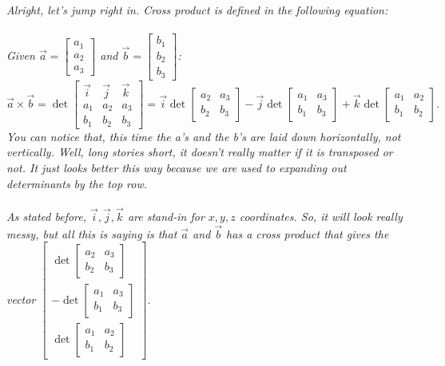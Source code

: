 \documentclass[addpoints]{exam}
\begin{document}
\textit{
Alright, let's jump right in. Cross product is defined in the following equation:\\\\ Given $\vec{a}=\begin{bmatrix}
    a_1\\a_2\\a_3
\end{bmatrix}$ and
$\vec{b}=\begin{bmatrix}
    b_1\\b_2\\b_3
\end{bmatrix}$: 
}
\[
\vec{a}\times\vec{b}=
\det\begin{bmatrix}
    \vec{i}&\vec{j}&\vec{k}\\
    a_1&a_2&a_3\\
    b_1&b_2&b_3
\end{bmatrix}
= \vec{i}\det\begin{bmatrix}
    a_2&a_3\\
    b_2&b_3
\end{bmatrix}
-\vec{j}\det\begin{bmatrix}
    a_1&a_3\\
    b_1&b_3
\end{bmatrix}
+\vec{k}\det\begin{bmatrix}
    a_1&a_2\\
    b_1&b_2
\end{bmatrix}.
\]
\textit{
You can notice that, this time the a's and the b's are laid down horizontally, not vertically. Well, long stories short, it doesn't really matter if it is transposed or not. It just looks better this way because we are used to expanding out determinants by the top row.\\\\
As stated before, $\vec{i},\vec{j},\vec{k}$ are stand-in for $x,y,z$ coordinates. So, it will look really messy, but all this is saying is that $\vec{a}$ and $\vec{b}$ has a cross product that gives the vector $\begin{bmatrix}
    \det\begin{bmatrix}
    a_2&a_3\\
    b_2&b_3
\end{bmatrix}\\
    -\det\begin{bmatrix}
    a_1&a_3\\
    b_1&b_3
\end{bmatrix}\\
    \det\begin{bmatrix}
    a_1&a_2\\
    b_1&b_2
\end{bmatrix}
\end{bmatrix}.$
}\\\\
\end{document}
